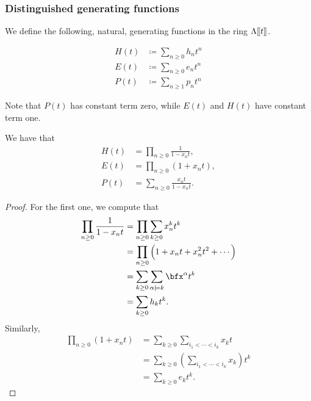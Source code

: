 \documentclass{article}
\newcommand{\lrBrack}[1]{[\kern-1.2pt[ {#1} ]\kern-1.2pt]}
\begin{document}
\subsubsection{Distinguished generating functions}

We define the following, natural, generating functions in the ring $\Lambda\lrBrack{t}$.

\begin{definition}
    \begin{align*}
        H(t) &\coloneq \sum_{n\geq0}h_n t^n \\
        E(t) &\coloneq \sum_{n\geq0}e_n t^n \\
        P(t) &\coloneq \sum_{n\geq1}p_n t^n
    \end{align*}
\end{definition}

Note that $P(t)$ has constant term zero, while $E(t)$ and $H(t)$ have constant term one.

\begin{theorem}\label{thm:HEPPowerSeries}
    We have that
    \begin{align*}
        H(t) &= \prod_{n\geq0}\frac{1}{1-x_nt}, \\
        E(t) &= \prod_{n\geq0}(1+x_nt), \\
        P(t) &= \sum_{n\geq0}\frac{x_nt}{1-x_nt}.
    \end{align*}
\end{theorem}

\begin{proof}
    For the first one, we compute that
    \begin{align*}
        \prod_{n\geq0}\frac{1}{1-x_nt} &= \prod_{n\geq0}\sum_{k\geq0}x_n^kt^k\\
                                        &= \prod_{n \geq 0}\Big(1 + x_nt + x_n^2t^2 + \cdots\Big) \\
                                        &= \sum_{k \geq 0}\sum_{\alpha \models k} \bfx^\alpha t^k \\
                                        &= \sum_{k \geq 0} h_kt^k.
    \end{align*}
    Similarly,
    \begin{align*}
        \prod_{n\geq0}(1+x_nt) 
        &=
        \sum_{k \geq 0}
        \sum_{i_1 < \cdots < i_k}
        x_k
        t
        \\
        &= 
        \sum_{k \geq 0}
        \left(
            \sum_{i_1 < \cdots < i_k}
            x_k
        \right)
        t^k
        \\
        &=
        \sum_{k \geq 0}
        e_kt^k.
    \end{align*}
\end{proof}
\end{document}
